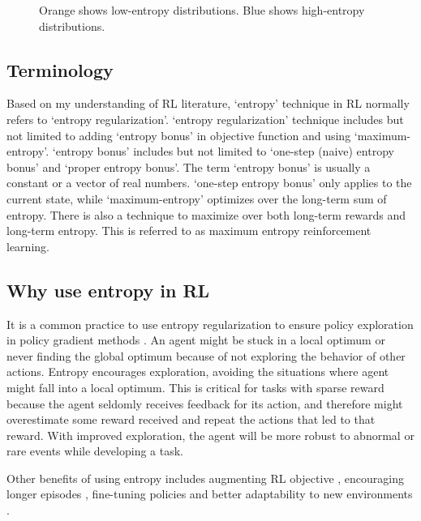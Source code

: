 \documentclass[lang=en,mode=normal,device=normal,color=blue,12pt]{elegantnote}
\DeclareMathOperator*{\1}{\mathbbm{1}}
\begin{document}
\begin{appendices}
\begin{figure}[!htbp]
  \centering
  \hfill
  \caption{Orange shows low-entropy distributions. Blue shows high-entropy distributions.}
  \label{fig:entropy}
\end{figure}

\subsection{Terminology}

Based on my understanding of RL literature, `entropy' technique in RL normally refers to `entropy regularization'. `entropy regularization' technique includes but not limited to adding `entropy bonus' in objective function and using `maximum-entropy'. `entropy bonus' includes but not limited to `one-step (naive) entropy bonus' and `proper entropy bonus'. The term `entropy bonus' is usually a constant or a vector of real numbers. `one-step entropy bonus' only applies to the current state, while `maximum-entropy' optimizes over the long-term sum of entropy. There is also a technique to maximize over both long-term rewards and long-term entropy. This is referred to as maximum entropy reinforcement learning.



\subsection{Why use entropy in RL}

It is a common practice to use entropy regularization to ensure policy exploration in policy gradient methods \cite{odonoghue2017combining}.
An agent might be stuck in a local optimum or never finding the global optimum because of not exploring the behavior of other actions.
Entropy encourages exploration, avoiding the situations where agent might fall into a local optimum.
This is critical for tasks with sparse reward because the agent seldomly receives feedback for its action, and therefore might overestimate some reward received and repeat the actions that led to that reward. With improved exploration, the agent will be more robust to abnormal or rare events while developing a task.

Other benefits of using entropy includes augmenting RL objective \cite{brianEntropy2010}, encouraging longer episodes \cite{schulman2018equivalence}, fine-tuning policies and better adaptability to new environments \cite{haarnoja2017reinforcement}.




\end{appendices}
\end{document}
